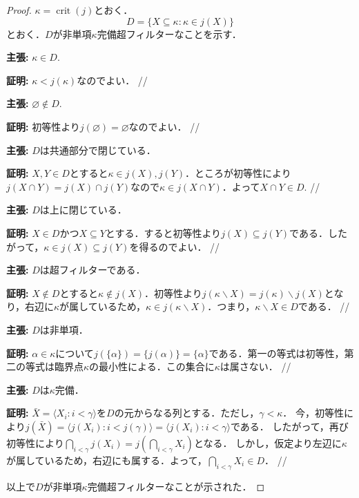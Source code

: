 \documentclass[uplatex]{jsarticle}
\newcommand{\crit}{\operatorname{crit}}
\newcommand{\seq}[1]{{\langle#1\rangle}}
\renewcommand\emptyset{\varnothing}
\renewcommand\subset{\subseteq}
\renewcommand{\setminus}{\smallsetminus}
\theoremstyle{definition}
\begin{document}
	\begin{proof}
		$\kappa = \crit(j)$とおく．
		\[
		D = \{ X \subset \kappa : \kappa \in j(X) \}
		\]
		とおく．$D$が非単項$\kappa$完備超フィルターなことを示す．
		
		\par \textbf{主張: } $\kappa \in D$.
		\par \textbf{証明: } $\kappa < j(\kappa)$なのでよい． \hfill //
		
		\par \textbf{主張: } $\emptyset\not \in D$.
		\par \textbf{証明: } 初等性より$j(\emptyset) = \emptyset$なのでよい． \hfill //
		
		\par \textbf{主張: } $D$は共通部分で閉じている．
		\par \textbf{証明: } $X, Y \in D$とすると$\kappa \in j(X), j(Y)$．ところが初等性により$j(X \cap Y) = j(X) \cap j(Y)$なので$\kappa \in j(X \cap Y)$．よって$X \cap Y \in D$. \hfill //
		
		\par \textbf{主張: } $D$は上に閉じている．
		\par \textbf{証明: } $X \in D$かつ$X \subset Y$とする．すると初等性より$j(X) \subset j(Y)$である．したがって，$\kappa \in j(X) \subset j(Y)$を得るのでよい． \hfill //
		
		\par \textbf{主張: } $D$は超フィルターである．
		\par \textbf{証明: } $X \not \in D$とすると$\kappa \not \in j(X)$．初等性より$j(\kappa \setminus X) = j(\kappa) \setminus j(X)$となり，右辺に$\kappa$が属しているため，$\kappa \in j(\kappa \setminus X)$．つまり，$\kappa \setminus X \in D$である． \hfill //
		
		\par \textbf{主張: } $D$は非単項．
		\par \textbf{証明: } 	$\alpha \in \kappa$について$j(\{\alpha\}) = \{j(\alpha)\} = \{\alpha\}$である．第一の等式は初等性，第二の等式は臨界点$\kappa$の最小性による．この集合に$\kappa$は属さない． \hfill //
		
		\par \textbf{主張: } $D$は$\kappa$完備．
		\par \textbf{証明: } 	$\bar{X} = \seq{X_i : i < \gamma }$を$D$の元からなる列とする．ただし，$\gamma < \kappa$．
		今，初等性により$j(\bar{X}) = \seq{j(X_i) : i < j(\gamma)} = \seq{j(X_i) : i < \gamma}$である．
		したがって，再び初等性により$\bigcap_{i < \gamma} j(X_i) = j(\bigcap_{i < \gamma} X_i)$となる．
		しかし，仮定より左辺に$\kappa$が属しているため，右辺にも属する．よって，$\bigcap_{i < \gamma} X_i \in D$． \hfill //
		
		\par 以上で$D$が非単項$\kappa$完備超フィルターなことが示された．
	\end{proof}
\end{document}
